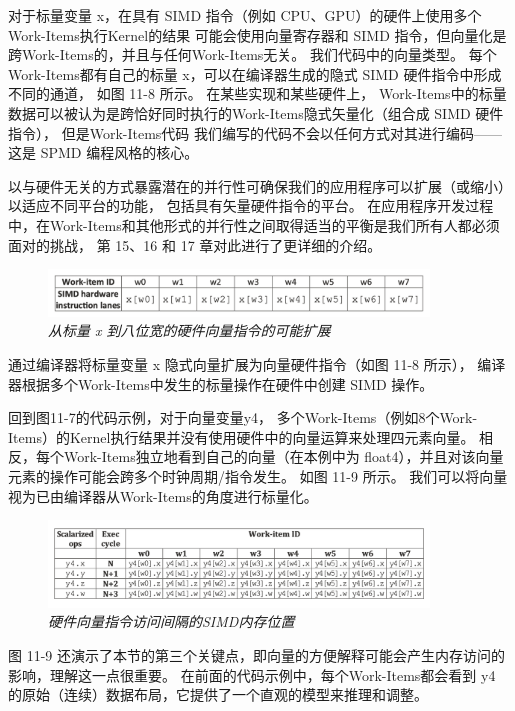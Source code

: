 对于标量变量 x，在具有 SIMD 指令（例如 CPU、GPU）的硬件上使用多个Work-Items执行Kernel的结果
可能会使用向量寄存器和 SIMD 指令，但向量化是跨Work-Items的，并且与任何Work-Items无关。 
我们代码中的向量类型。 每个Work-Items都有自己的标量 x，可以在编译器生成的隐式 SIMD 硬件指令中形成不同的通道，
如图 11-8 所示。 在某些实现和某些硬件上，
Work-Items中的标量数据可以被认为是跨恰好同时执行的Work-Items隐式矢量化（组合成 SIMD 硬件指令），
但是Work-Items代码 我们编写的代码不会以任何方式对其进行编码——这是 SPMD 编程风格的核心。

以与硬件无关的方式暴露潜在的并行性可确保我们的应用程序可以扩展（或缩小）以适应不同平台的功能，
包括具有矢量硬件指令的平台。 
在应用程序开发过程中，在Work-Items和其他形式的并行性之间取得适当的平衡是我们所有人都必须面对的挑战，
第 15、16 和 17 章对此进行了更详细的介绍。

\begin{figure}[H]
	\centering
	\includegraphics[width=0.9\textwidth]{figs/F11.8.png}
	\caption{\textit{从标量 x 到八位宽的硬件向量指令的可能扩展 }}
\end{figure}

通过编译器将标量变量 x 隐式向量扩展为向量硬件指令（如图 11-8 所示），
编译器根据多个Work-Items中发生的标量操作在硬件中创建 SIMD 操作。

回到图11-7的代码示例，对于向量变量y4，
多个Work-Items（例如8个Work-Items）的Kernel执行结果并没有使用硬件中的向量运算来处理四元素向量。 
相反，每个Work-Items独立地看到自己的向量（在本例中为 float4），并且对该向量元素的操作可能会跨多个时钟周期/指令发生。 
如图 11-9 所示。 我们可以将向量视为已由编译器从Work-Items的角度进行标量化。

\begin{figure}[H]
	\centering
	\includegraphics[width=0.9\textwidth]{figs/F11.9.png}
	\caption{\textit{硬件向量指令访问间隔的SIMD内存位置 }}
\end{figure}

图 11-9 还演示了本节的第三个关键点，即向量的方便解释可能会产生内存访问的影响，理解这一点很重要。 
在前面的代码示例中，每个Work-Items都会看到 y4 的原始（连续）数据布局，它提供了一个直观的模型来推理和调整。

